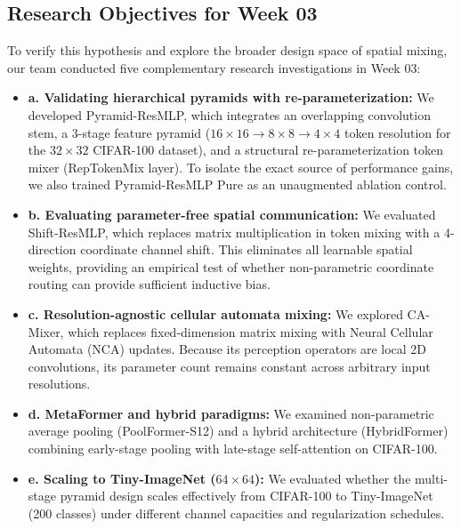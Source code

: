 \subsection{Research Objectives for Week 03}
To verify this hypothesis and explore the broader design space of spatial mixing, our team conducted five complementary research investigations in Week 03:
\begin{itemize}
    \item \textbf{a. Validating hierarchical pyramids with re-parameterization:} We developed Pyramid-ResMLP, which integrates an overlapping convolution stem, a 3-stage feature pyramid ($16 \times 16 \rightarrow 8 \times 8 \rightarrow 4 \times 4$ token resolution for the $32 \times 32$ CIFAR-100 dataset), and a structural re-parameterization token mixer (RepTokenMix layer). To isolate the exact source of performance gains, we also trained Pyramid-ResMLP Pure as an unaugmented ablation control.
    \item \textbf{b. Evaluating parameter-free spatial communication:} We evaluated Shift-ResMLP, which replaces matrix multiplication in token mixing with a 4-direction coordinate channel shift. This eliminates all learnable spatial weights, providing an empirical test of whether non-parametric coordinate routing can provide sufficient inductive bias.
    \item \textbf{c. Resolution-agnostic cellular automata mixing:} We explored CA-Mixer, which replaces fixed-dimension matrix mixing with Neural Cellular Automata (NCA) updates. Because its perception operators are local 2D convolutions, its parameter count remains constant across arbitrary input resolutions.
    \item \textbf{d. MetaFormer and hybrid paradigms:} We examined non-parametric average pooling (PoolFormer-S12) and a hybrid architecture (HybridFormer) combining early-stage pooling with late-stage self-attention on CIFAR-100.
    \item \textbf{e. Scaling to Tiny-ImageNet ($64 \times 64$):} We evaluated whether the multi-stage pyramid design scales effectively from CIFAR-100 to Tiny-ImageNet (200 classes) under different channel capacities and regularization schedules.
\end{itemize}

